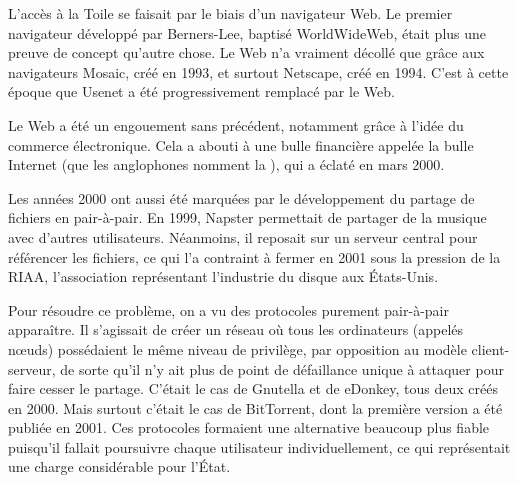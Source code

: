 L'accès à la Toile se faisait par le biais d'un navigateur Web. Le premier navigateur développé par Berners-Lee, baptisé WorldWideWeb, était plus une preuve de concept qu'autre chose. Le Web n'a vraiment décollé que grâce aux navigateurs Mosaic, créé en 1993, et surtout Netscape, créé en 1994. C'est à cette époque que Usenet a été progressivement remplacé par le Web.

Le Web a été un engouement sans précédent, notamment grâce à l'idée du commerce électronique. Cela a abouti à une bulle financière appelée la bulle Internet (que les anglophones nomment la ), qui a éclaté en mars 2000. %

Les années 2000 ont aussi été marquées par le développement du partage de fichiers en pair-à-pair. En 1999, Napster permettait de partager de la musique avec d'autres utilisateurs. Néanmoins, il reposait sur un serveur central pour référencer les fichiers, ce qui l'a contraint à fermer en 2001 sous la pression de la RIAA, l'association représentant l'industrie du disque aux États-Unis.

Pour résoudre ce problème, on a vu des protocoles purement pair-à-pair apparaître. Il s'agissait de créer un réseau où tous les ordinateurs (appelés nœuds) possédaient le même niveau de privilège, par opposition au modèle client-serveur, de sorte qu'il n'y ait plus de point de défaillance unique à attaquer pour faire cesser le partage. C'était le cas de Gnutella et de eDonkey, tous deux créés en 2000. Mais surtout c'était le cas de BitTorrent, dont la première version a été publiée en 2001. Ces protocoles formaient une alternative beaucoup plus fiable puisqu'il fallait poursuivre chaque utilisateur individuellement, ce qui représentait une charge considérable pour l'État.


